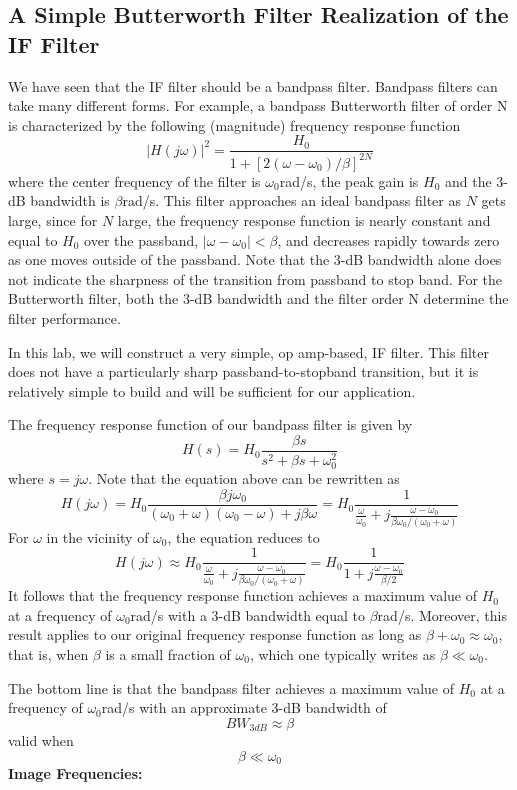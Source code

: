\documentclass[a4paper]{article}
\begin{document}
\subsection{A Simple Butterworth Filter Realization of the IF Filter}
We have seen that the IF filter should be a bandpass filter. Bandpass filters can take many different forms. For example, a bandpass Butterworth filter of order N is characterized by the following (magnitude) frequency response function
$$|H(j\omega)|^2 = \frac{H_0}{1+[2(\omega-\omega_0)/\beta]^{2N}}$$
where the center frequency of the filter is $\omega_0$rad/s, the peak gain is $H_0$ and the 3-dB bandwidth is $\beta$rad/s. This filter approaches an ideal bandpass filter as $N$ gets large, since for $N$ large, the frequency response function is nearly constant and equal to $H_0$ over the passband, $|\omega-\omega_0|<\beta$, and decreases rapidly towards zero as one moves outside of the passband. Note that the 3-dB bandwidth alone does not indicate the sharpness of the transition from passband to stop band. For the Butterworth filter, both the 3-dB bandwidth and the filter order N determine the filter performance.

In this lab, we will construct a very simple, op amp-based, IF filter. This filter does not have a particularly sharp passband-to-stopband transition, but it is relatively simple to build and will be sufficient for our application.

The frequency response function of our bandpass filter is given by
$$H(s)=H_0\frac{\beta s}{s^2+\beta s+\omega_0^2}$$
where $s=j\omega$. Note that the equation above can be rewritten as
$$H(j\omega)=H_0\frac{\beta j\omega_0}{(\omega_0+\omega)(\omega_0-\omega)+j\beta\omega}=H_0\frac{1}{\frac{\omega}{\omega_0}+j\frac{\omega-\omega_0}{\beta\omega_0/(\omega_0+\omega)}}$$
For $\omega$ in the vicinity of $\omega_0$, the equation reduces to
$$H(j\omega)\approx H_0\frac{1}{\frac{\omega}{\omega_0}+j\frac{\omega-\omega_0}{\beta\omega_0/(\omega_0+\omega)}}=H_0\frac{1}{1+j\frac{\omega-\omega_0}{\beta/2}}$$
It follows that the frequency response function achieves a maximum value of $H_0$ at a frequency of $\omega_0$rad/s with a 3-dB bandwidth equal to $\beta$rad/s. Moreover, this result applies to our original frequency response function as long as $\beta+\omega_0\approx\omega_0$, that is, when $\beta$ is a small fraction of $\omega_0$, which one typically writes as $\beta\ll\omega_0$.

The bottom line is that the bandpass filter achieves a maximum value of $H_0$ at a frequency of $\omega_0$rad/s with an approximate 3-dB bandwidth of
$$BW_{3dB}\approx\beta$$
valid when
$$\beta\ll\omega_0$$
\textbf{Image Frequencies:}
\end{document}
